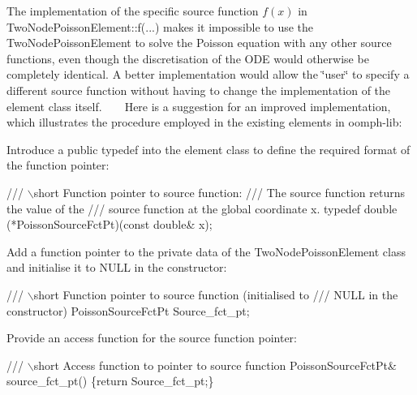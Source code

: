 \begin{DoxyItemize}
\item The implementation of the specific source function $ f(x) $ in {\ttfamily Two\+Node\+Poisson\+Element\+::f}(...) makes it impossible to use the {\ttfamily Two\+Node\+Poisson\+Element} to solve the Poisson equation with any other source functions, even though the discretisation of the O\+DE would otherwise be completely identical. A better implementation would allow the \char`\"{}user\char`\"{} to specify a different source function without having to change the implementation of the element class itself. ~\newline
 ~\newline
 Here is a suggestion for an improved implementation, which illustrates the procedure employed in the existing elements in {\ttfamily oomph-\/lib}\+:
\begin{DoxyItemize}
\item Introduce a public typedef into the element class to define the required format of the function pointer\+: 
\begin{DoxyCode}
\textcolor{comment}{/// \(\backslash\)short Function pointer to source function: }
\textcolor{comment}{}\textcolor{comment}{/// The source function returns the value of the }
\textcolor{comment}{}\textcolor{comment}{/// source function at the global coordinate x.}
\textcolor{comment}{}\textcolor{keyword}{typedef} double (*PoissonSourceFctPt)(\textcolor{keyword}{const} \textcolor{keywordtype}{double}& x);
\end{DoxyCode}

\item Add a function pointer to the private data of the {\ttfamily Two\+Node\+Poisson\+Element} class and initialise it to N\+U\+LL in the constructor\+: 
\begin{DoxyCode}
\textcolor{comment}{/// \(\backslash\)short Function pointer to source function (initialised to}
\textcolor{comment}{}\textcolor{comment}{/// NULL in the constructor)}
\textcolor{comment}{}PoissonSourceFctPt Source\_fct\_pt;
\end{DoxyCode}

\item Provide an access function for the source function pointer\+: 
\begin{DoxyCode}
\textcolor{comment}{/// \(\backslash\)short Access function to pointer to source function}
\textcolor{comment}{}PoissonSourceFctPt& source\_fct\_pt() \{\textcolor{keywordflow}{return} Source\_fct\_pt;\}
\end{DoxyCode}


\end{DoxyItemize}
\end{DoxyItemize}

